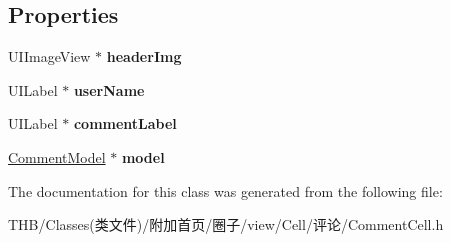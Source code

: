 \subsection*{Properties}
\begin{DoxyCompactItemize}
\item 
\mbox{\label{interface_comment_cell_ab5ec7f22242ea1e1be45f22b6488722c}} 
U\+I\+Image\+View $\ast$ {\bfseries header\+Img}
\item 
\mbox{\label{interface_comment_cell_af5ff3fb9a496c213f7f6cc7f3d9b83e1}} 
U\+I\+Label $\ast$ {\bfseries user\+Name}
\item 
\mbox{\label{interface_comment_cell_a3e183b95f1aa6ed5a2a81f74d535f065}} 
U\+I\+Label $\ast$ {\bfseries comment\+Label}
\item 
\mbox{\label{interface_comment_cell_a60f601702ab72385043775c66508d6e8}} 
\mbox{\hyperlink{interface_comment_model}{Comment\+Model}} $\ast$ {\bfseries model}
\end{DoxyCompactItemize}


The documentation for this class was generated from the following file\+:\begin{DoxyCompactItemize}
\item 
T\+H\+B/\+Classes(类文件)/附加首页/圈子/view/\+Cell/评论/Comment\+Cell.\+h\end{DoxyCompactItemize}
